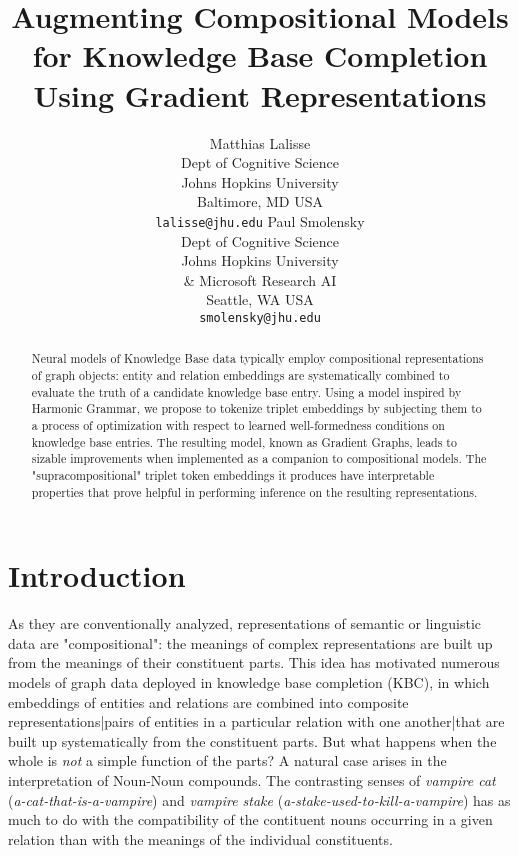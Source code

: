 \documentclass[a4paper,10pt]{article}
\begin{document}
\title{Augmenting Compositional Models for Knowledge Base Completion Using Gradient Representations}
\author{Matthias Lalisse\\
Dept of Cognitive Science\\
Johns Hopkins University\\
Baltimore, MD USA \\
{\tt lalisse@jhu.edu} \And
Paul Smolensky\\
Dept of Cognitive Science\\
Johns Hopkins University\\
\& Microsoft Research AI \\
Seattle, WA USA\\
{\tt smolensky@jhu.edu}
}

\maketitle

\begin{abstract}
Neural models of Knowledge Base data typically employ compositional representations of graph objects: entity and relation embeddings are systematically combined to evaluate the truth of a candidate knowledge base entry. Using a model inspired by Harmonic Grammar, we propose to tokenize triplet embeddings by subjecting them to a process of optimization with respect to learned well-formedness conditions on knowledge base entries. The resulting model, known as Gradient Graphs, leads to sizable improvements when implemented as a companion to compositional models. The "supracompositional" triplet token embeddings it produces have interpretable properties that prove helpful in performing inference on the resulting representations.\end{abstract}

\section{Introduction} 

As they are conventionally analyzed, representations of semantic or linguistic data are "compositional": the meanings of complex representations are built up from the meanings of their constituent parts. This idea has motivated numerous models of graph data deployed in knowledge base completion (KBC), in which embeddings of entities and relations are combined into composite representations|pairs of entities in a particular relation with one another|that are built up systematically from the constituent parts. But what happens when the whole is \emph{not} a simple function of the parts? A natural case arises in the interpretation of Noun-Noun compounds. The contrasting senses of \emph{vampire cat} (\emph{a-cat-that-is-a-vampire}) and \emph{vampire stake} (\emph{a-stake-used-to-kill-a-vampire}) has as much to do with the compatibility of the contituent nouns occurring in a given relation than with the meanings of the individual constituents.
\end{document}

